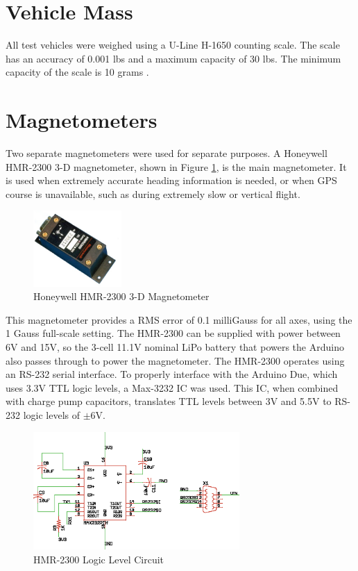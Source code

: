 \section{Vehicle Mass}
All test vehicles were weighed using a U-Line H-1650 counting scale. The scale has an accuracy of 0.001 lbs and a maximum capacity of 30 lbs. The minimum capacity of the scale is 10 grams \cite{U-Line}.
\section{Magnetometers}
Two separate magnetometers were used for separate purposes. A Honeywell HMR-2300 3-D magnetometer, shown in Figure \ref{hmr23000Picture}, is the main magnetometer. It is used when extremely accurate heading information is needed, or when GPS course is unavailable, such as during extremely slow or vertical flight.

\begin{figure}[H]

  \centering
    \includegraphics[width=0.3\textwidth]{figures/hmr2300.jpg}
      \caption{Honeywell HMR-2300 3-D Magnetometer } \label{hmr23000Picture}
\end{figure}

This magnetometer provides a RMS error of 0.1 milliGauss for all axes, using the 1 Gauss full-scale setting\cite{hmr2300DataSheet}.
The HMR-2300 can be supplied with power between 6V and 15V, so the 3-cell 11.1V nominal LiPo battery that powers the Arduino also passes through to power the magnetometer. The HMR-2300 operates using an RS-232 serial interface. To properly interface with the Arduino Due, which uses 3.3V TTL logic levels, a Max-3232 IC was used. This IC, when combined with charge pump capacitors, translates TTL levels between 3V and 5.5V to RS-232 logic levels of $\pm6$V.
 \begin{figure}[H]

   \centering
     \includegraphics[width=0.7\textwidth]{figures/magBoard.eps}
        \caption{HMR-2300 Logic Level Circuit} \label{magBoardSchematic}
 \end{figure}
 
